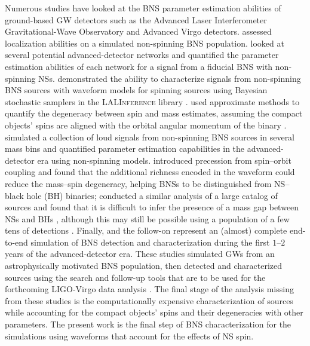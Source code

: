 Numerous studies have looked at the BNS parameter estimation abilities of ground-based GW detectors such as the Advanced Laser Interferometer Gravitational-Wave Observatory \citep[aLIGO;][]{Aasi_2015} and Advanced Virgo \citep[AdV;][]{Acernese_2014} detectors. \citet{Nissanke_2010,Nissanke_2011} assessed localization abilities on a simulated non-spinning BNS population. \citet{Veitch_2012} looked at several potential advanced-detector networks and quantified the parameter estimation abilities of each network for a signal from a fiducial BNS with non-spinning NSs. \citet{Aasi_2013} demonstrated the ability to characterize signals from non-spinning BNS sources with waveform models for spinning sources using Bayesian stochastic samplers in the \textsc{LALInference} library \citep{Veitch_2014}.  \citet{Hannam_2013} used approximate methods to quantify the degeneracy between spin and mass estimates, assuming the compact objects' spins are aligned with the orbital angular momentum of the binary \citep[but see][]{Haster_2015}. \citet{Rodriguez_2014} simulated a collection of loud signals from non-spinning BNS sources in several mass bins and quantified parameter estimation capabilities in the advanced-detector era using non-spinning models.  \citet{Chatziioannou_2014} introduced precession from spin--orbit coupling and found that the additional richness encoded in the waveform could reduce the mass--spin degeneracy, helping BNSs to be distinguished from NS--black hole (BH) binaries; \citet{Littenberg:2015tpa} conducted a similar analysis of a large catalog of sources and found that it is difficult to infer the presence of a mass gap between NSs and BHs \citep{Ozel:2010su,Farr:2010tu,Kreidberg:2012ud}, although this may still be possible using a population of a few tens of detections \citep{Mandel:2015spa}.  Finally, \citet{Singer_2014} and the follow-on \citet{Berry_2014} represent an (almost) complete end-to-end simulation of BNS detection and characterization during the first $1$--$2$ years of the advanced-detector era. These studies simulated GWs from an astrophysically motivated BNS population, then detected and characterized sources using the search and follow-up tools that are to be used for the forthcoming LIGO-Virgo data analysis \citep{WhitePaper2014}.   The final stage of the analysis missing from these studies is the computationally expensive characterization of sources while accounting for the compact objects' spins and their degeneracies with other parameters.  The present work is the final step of BNS characterization for the \citet{Singer_2014} simulations using waveforms that account for the effects of NS spin.

